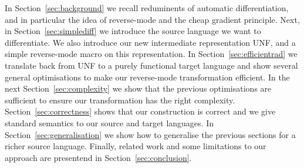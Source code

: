 In Section~\ref{sec:background} we recall reduminents of automatic differentiation, and in particular the idea of reverse-mode and the cheap gradient principle.
Next, in Section~\ref{sec:simplediff} we introduce the source language we want to differentiate. We also introduce our new intermediate representation UNF, and a simple reverse-mode macro on this representation.
In Section~\ref{sec:efficientrad} we translate back from UNF to a purely functional target language and show several general optimisations to make our reverse-mode transformation efficient.
In the next Section~\ref{sec:complexity} we show that the previous optimisations are sufficient to ensure our transformation has the right complexity.
Section~\ref{sec:correctness} shows that our construction is correct and we give standard semantics to our source and target languages. 
In Section~\ref{sec:generalisation} we show how to generalise the previous sections for a richer source language. 
Finally, related work and some limitations to our approach are presentend in Section~\ref{sec:conclusion}.